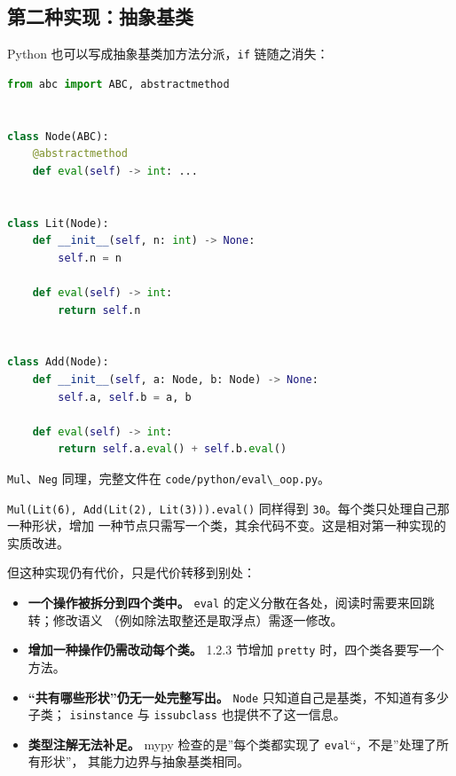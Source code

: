 \subsection{第二种实现：抽象基类}\label{ux7b2cux4e8cux79cdux5b9eux73b0ux62bdux8c61ux57faux7c7b}

Python 也可以写成抽象基类加方法分派，\passthrough{\lstinline!if!} 链随之消失：

\begin{lstlisting}[language=Python]
from abc import ABC, abstractmethod


class Node(ABC):
    @abstractmethod
    def eval(self) -> int: ...


class Lit(Node):
    def __init__(self, n: int) -> None:
        self.n = n

    def eval(self) -> int:
        return self.n


class Add(Node):
    def __init__(self, a: Node, b: Node) -> None:
        self.a, self.b = a, b

    def eval(self) -> int:
        return self.a.eval() + self.b.eval()
\end{lstlisting}

\passthrough{\lstinline!Mul!}、\passthrough{\lstinline!Neg!} 同理，完整文件在 \passthrough{\lstinline!code/python/eval\_oop.py!}。

\passthrough{\lstinline!Mul(Lit(6), Add(Lit(2), Lit(3))).eval()!} 同样得到 \passthrough{\lstinline!30!}。每个类只处理自己那一种形状，增加
一种节点只需写一个类，其余代码不变。这是相对第一种实现的实质改进。

但这种实现仍有代价，只是代价转移到别处：

\begin{itemize}
\tightlist
\item
  \textbf{一个操作被拆分到四个类中。} \passthrough{\lstinline!eval!} 的定义分散在各处，阅读时需要来回跳转；修改语义
  （例如除法取整还是取浮点）需逐一修改。
\item
  \textbf{增加一种操作仍需改动每个类。} 1.2.3 节增加 \passthrough{\lstinline!pretty!} 时，四个类各要写一个方法。
\item
  \textbf{``共有哪些形状''仍无一处完整写出。} \passthrough{\lstinline!Node!} 只知道自己是基类，不知道有多少子类；
  \passthrough{\lstinline!isinstance!} 与 \passthrough{\lstinline!issubclass!} 也提供不了这一信息。
\item
  \textbf{类型注解无法补足。} mypy 检查的是''每个类都实现了 \passthrough{\lstinline!eval!}``，不是''处理了所有形状''，
  其能力边界与抽象基类相同。
\end{itemize}

